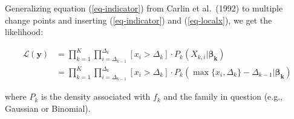 \documentclass[
  american,
]{article}
\begin{document}
Generalizing equation (\ref{eq-indicator}) from Carlin et al.~(1992) to multiple change points and inserting (\ref{eq-indicator}) and (\ref{eq-localx}), we get the likelihood:

\begin{equation}
\begin{aligned}
\mathcal{L}(\mathbf{y}) & = \prod_{k = 1}^K\prod_{i = \Delta_{k-1}}^{\Delta_k} [x_i > \Delta_k]\cdot P_k(X_{k, i}|\mathbf{\beta_k}) \\
                        & = \prod_{k = 1}^K\prod_{i = \Delta_{k-1}}^{\Delta_k} [x_i > \Delta_k]\cdot P_k(\max\{x_i, \Delta_k\} - \Delta_{k-1}|\mathbf{\beta_k})
\end{aligned}
\end{equation}

where \(P_k\) is the density associated with \(f_k\) and the family in question (e.g., Gaussian or Binomial).

\renewcommand\refname{References}
  
\end{document}
